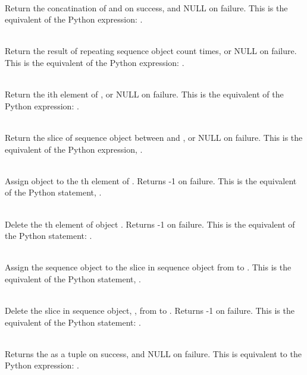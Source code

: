      \\
	 Return the concatination of  and  on success, and NULL on
	 failure.   This is the equivalent of the Python
	 expression: .


     \\
	 Return the result of repeating sequence object  count times,
	 or NULL on failure.  This is the equivalent of the Python
	 expression: .


     \\
	 Return the ith element of , or NULL on failure. This is the
	 equivalent of the Python expression: .


     \\
	 Return the slice of sequence object  between  and , or
	 NULL on failure. This is the equivalent of the Python
	 expression, .


     \\
	 Assign object  to the th element of .
Returns -1 on failure.  This is the equivalent of the Python
	 statement, .

     \\
	 Delete the th element of object .  Returns
	 -1 on failure.  This is the equivalent of the Python
	 statement: .

     \\
         Assign the sequence object  to the slice in sequence
	 object  from  to .  This is the equivalent of the Python
	 statement, .

     \\
	 Delete the slice in sequence object, , from  to .
	 Returns -1 on failure. This is the equivalent of the Python
	 statement: .

     \\
	 Returns the  as a tuple on success, and NULL on failure.
	 This is equivalent to the Python expression: .

